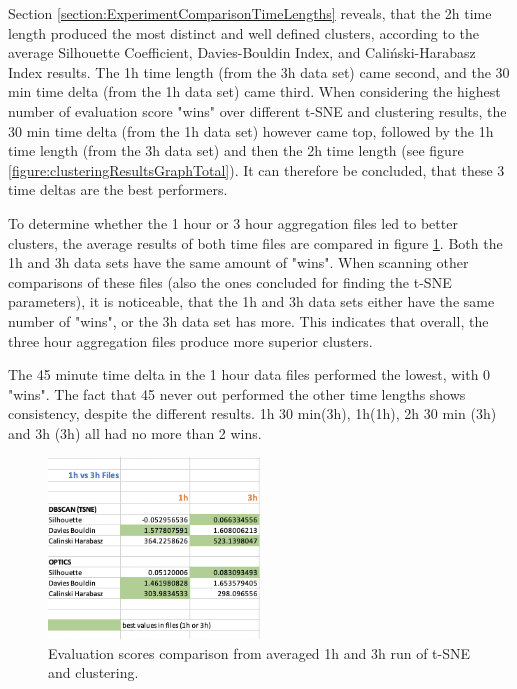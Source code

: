 
Section \ref{section:ExperimentComparisonTimeLengths} reveals, that the 2h time length produced the most distinct and well defined clusters, according to the average Silhouette Coefficient, Davies-Bouldin Index, and Caliński-Harabasz Index results. The 1h time length (from the 3h data set) came second, and the 30 min time delta (from the 1h data set) came third. When considering the highest number of evaluation score "wins" over different t-SNE and clustering results, the 30 min time delta (from the 1h data set) however came top, followed by the 1h time length (from the 3h data set) and then the 2h time length (see figure \ref{figure:clusteringResultsGraphTotal}). It can therefore be concluded, that these 3 time deltas are the best performers.

To determine whether the 1 hour or 3 hour aggregation files led to better clusters, the average results of both time files are compared in figure \ref{figure:clusteringResults7}. Both the 1h and 3h data sets have the same amount of "wins". When scanning other comparisons of these files (also the ones concluded for finding the t-SNE parameters), it is noticeable, that the 1h and 3h data sets either have the same number of "wins", or the 3h data set has more. This indicates that overall, the three hour aggregation files produce more superior clusters.


The 45 minute time delta in the 1 hour data files performed the lowest, with 0 "wins". The fact that 45 never out performed the other time lengths shows consistency, despite the different results. 1h 30 min(3h), 1h(1h), 2h 30 min (3h) and 3h (3h) all had no more than 2 wins. 


\begin{figure}
  \centering
  \includegraphics[width=0.5\textwidth]{./images/clusteringResults/clusteringResults7.png}
  \caption{Evaluation scores comparison from averaged 1h and 3h run of t-SNE and clustering.}
  \label{figure:clusteringResults7}
\end{figure}


